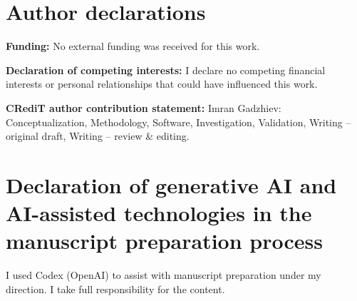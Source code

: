 \documentclass[preprint,12pt,a4paper]{elsarticle}
\begin{document}
\par{}\noindent\begin{minipage}{\textwidth}
\section*{Author declarations}
\textbf{Funding:} No external funding was received for this work.

\textbf{Declaration of competing interests:} I declare no competing financial
interests or personal relationships that could have influenced this work.

\textbf{CRediT author contribution statement:} Imran Gadzhiev: Conceptualization,
Methodology, Software, Investigation, Validation, Writing -- original draft,
Writing -- review \& editing.

\section*{Declaration of generative AI and AI-assisted technologies in the manuscript preparation process}
I used Codex (OpenAI) to assist with manuscript preparation under my direction.
I take full responsibility for the content.
\end{minipage}

\begingroup\small


\endgroup
\end{document}
